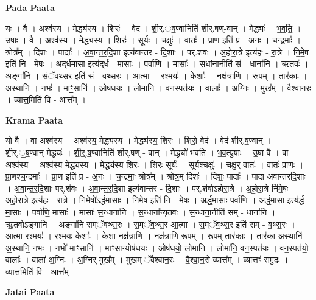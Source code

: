 \documentclass[17pt]{extarticle}
\begin{document}
\textbf{Pada Paata} \newline

यः । वै । अश्व॑स्य । मेद्ध्य॑स्य । शिरः॑ । वेद॑ । शी॒र्.॒ष॒ण्वानिति॑ शीर्.षण्-वान् । मेद्ध्यः॑ । भ॒व॒ति॒ । उ॒षाः । वै । अश्व॑स्य । मेद्ध्य॑स्य । शिरः॑ । सूर्यः॑ । चक्षुः॑ । वातः॑ । प्रा॒ण इति॑ प्र - अ॒नः । च॒न्द्रमाः᳚ । श्रोत्र᳚म् । दिशः॑ । पादाः᳚ । अ॒वा॒न्त॒र॒दि॒शा इत्य॑वान्तर - दि॒शाः । पर्.श॑वः । अ॒हो॒रा॒त्रे इत्य॑हः - रा॒त्रे । नि॒मे॒ष इति॑ नि - मे॒षः । अ॒द्‌र्ध॒मा॒सा इत्य॑द्‌र्ध - मा॒साः । पर्वा॑णि । मासाः᳚ । स॒धांना॒नीति॑ सं - धाना॑नि । ऋ॒तवः॑ । अङ्गा॑नि । सं॒ॅव॒थ्स॒र इति॑ सं - व॒थ्स॒रः । आ॒त्मा । र॒श्मयः॑ । केशाः᳚ । नक्ष॑त्राणि । रू॒पम् । तार॑काः । अ॒स्थानि॑ । नभः॑ । माꣳ॒॒सानि॑ । ओष॑धयः । लोमा॑नि । वन॒स्पत॑यः । वालाः᳚ । अ॒ग्निः । मुख᳚म् । वै॒श्वा॒न॒रः । व्यात्त॒मिति॑ वि - आत्त᳚म् ।  \newline


\textbf{Krama Paata} \newline

यो वै । वा अश्व॑स्य । अश्व॑स्य॒ मेद्ध्य॑स्य । मेद्ध्य॑स्य॒ शिरः॑ । शिरो॒ वेद॑ । वेद॑ शीर्.ष॒ण्वान् । शी॒र्.॒ष॒ण्वान् मेद्ध्यः॑ । शी॒र्॒.ष॒ण्वानिति॑ शीर्.षण् - वान् । मेद्ध्यो॑ भवति । भ॒व॒त्यु॒षाः । उ॒षा वै । वा अश्व॑स्य । अश्व॑स्य॒ मेद्ध्य॑स्य । मेद्ध्य॑स्य॒ शिरः॑ । शिरः॒ सूर्यः॑ । सूर्य॒श्चक्षुः॑ । चक्षु॒र् वातः॑ । वातः॑ प्रा॒णः । प्रा॒णश्च॒न्द्रमाः᳚ । प्रा॒ण इति॑ प्र - अ॒नः । च॒न्द्रमाः॒ श्रोत्र᳚म् । श्रोत्र॒म् दिशः॑ । दिशः॒ पादाः᳚ । पादा॑ अवान्तरदि॒शाः । अ॒वा॒न्त॒र॒दि॒शाः पर्.श॑वः । अ॒वा॒न्त॒र॒दि॒शा इत्य॑वान्तर - दि॒शाः । पर्.श॑वोऽहोरा॒त्रे । अ॒हो॒रा॒त्रे नि॑मे॒षः । अ॒हो॒रा॒त्रे इत्य॑हः - रा॒त्रे । नि॒मे॒षो᳚ऽर्द्धमा॒साः । नि॒मे॒ष इति॑ नि - मे॒षः । अ॒र्द्ध॒मा॒साः पर्वा॑णि । अ॒र्द्ध॒मा॒सा इत्य॑र्द्ध - मा॒साः । पर्वा॑णि॒ मासाः᳚ । मासाः᳚ स॒न्धाना॑नि । स॒न्धाना᳚न्यृ॒तवः॑ । स॒न्धाना॒नीति॑ सम् - धाना॑नि । ऋ॒तवोऽङ्‍गा॑नि । अङ्‍गा॑नि सम्ॅवथ्स॒रः । स॒म्ॅव॒थ्स॒र आ॒त्मा । स॒म्ॅव॒थ्स॒र इति॑ सम् - व॒थ्स॒रः । आ॒त्मा र॒श्मयः॑ । र॒श्मयः॒ केशाः᳚ । केशा॒ नक्ष॑त्राणि । नक्ष॑त्राणि रू॒पम् । रू॒पम् तार॑काः । तार॑का अ॒स्थानि॑ । अ॒स्थानि॒ नभः॑ । नभो॑ माꣳ॒॒सानि॑ । माꣳ॒॒सान्योष॑धयः । ओष॑धयो॒ लोमा॑नि । लोमा॑नि॒ वन॒स्पत॑यः । वन॒स्पत॑यो॒ वालाः᳚ । वाला॑ अ॒ग्निः । अ॒ग्निर् 
मुख᳚म् । मुख॑म् ॅवैश्वान॒रः । वै॒श्वा॒न॒रो व्यात्त᳚म् । व्यात्तꣳ॑ समु॒द्रः । व्यात्त॒मिति॑ वि - आत्त᳚म् \newline

\textbf{Jatai Paata} \newline
\end{document}
